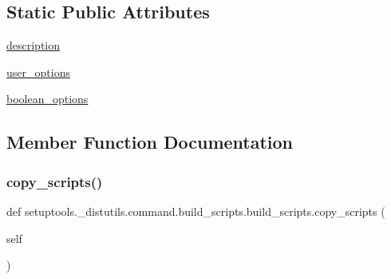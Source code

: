 \subsection*{Static Public Attributes}
\begin{DoxyCompactItemize}
\item 
\hyperlink{classsetuptools_1_1__distutils_1_1command_1_1build__scripts_1_1build__scripts_a483940402ec1f11ea57ede7148edc06f}{description}
\item 
\hyperlink{classsetuptools_1_1__distutils_1_1command_1_1build__scripts_1_1build__scripts_a8803f8736b970ec52d1b1e56c5383732}{user\+\_\+options}
\item 
\hyperlink{classsetuptools_1_1__distutils_1_1command_1_1build__scripts_1_1build__scripts_a6087bd332851367aec7c8b2f2688a3c0}{boolean\+\_\+options}
\end{DoxyCompactItemize}


\subsection{Member Function Documentation}
\mbox{\label{classsetuptools_1_1__distutils_1_1command_1_1build__scripts_1_1build__scripts_abce1fbb50d4fa5a832f4241f5a452482}} 
\subsubsection{\texorpdfstring{copy\+\_\+scripts()}{copy\_scripts()}}
{\footnotesize\ttfamily def setuptools.\+\_\+distutils.\+command.\+build\+\_\+scripts.\+build\+\_\+scripts.\+copy\+\_\+scripts (\begin{DoxyParamCaption}\item[{}]{self }\end{DoxyParamCaption})}

